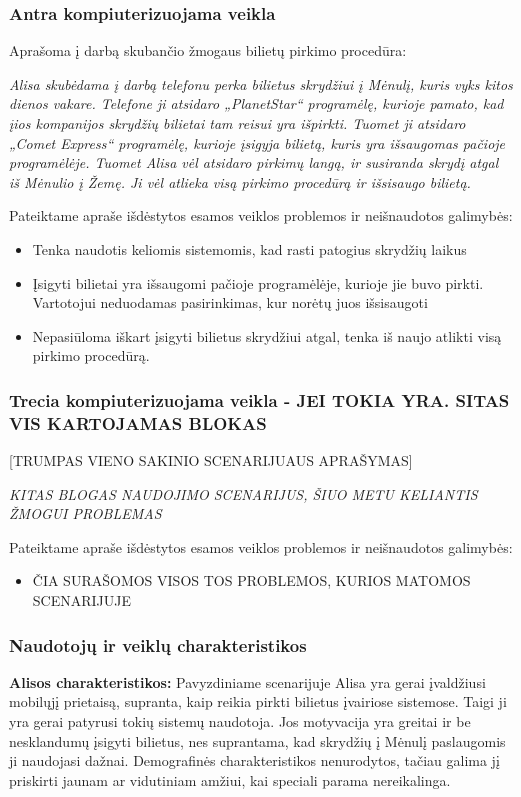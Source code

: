\documentclass{VUMIFPSkursinis}
\begin{document}
\subsubsection{Antra kompiuterizuojama veikla}
Aprašoma į darbą skubančio žmogaus bilietų pirkimo procedūra: 

\textit{Alisa skubėdama į darbą telefonu perka bilietus skrydžiui į Mėnulį, kuris vyks kitos dienos vakare. Telefone ji atsidaro „PlanetStar“ programėlę, kurioje pamato, kad įios kompanijos skrydžių bilietai tam reisui yra išpirkti. Tuomet ji atsidaro „Comet Express“ programėlę, kurioje įsigyja bilietą, kuris yra išsaugomas pačioje programėlėje. Tuomet Alisa vėl atsidaro pirkimų langą, ir susiranda skrydį atgal iš Mėnulio į Žemę. Ji vėl atlieka visą pirkimo procedūrą ir išsisaugo bilietą.}

Pateiktame apraše išdėstytos esamos veiklos problemos ir neišnaudotos galimybės:  
\begin{itemize}
\item Tenka naudotis keliomis sistemomis, kad rasti patogius skrydžių laikus
\item Įsigyti bilietai yra išsaugomi pačioje programėlėje, kurioje jie buvo pirkti. Vartotojui neduodamas pasirinkimas, kur norėtų juos išsisaugoti
\item Nepasiūloma iškart įsigyti bilietus skrydžiui atgal, tenka iš naujo atlikti visą pirkimo procedūrą.
\end{itemize}

\subsubsection{Trecia kompiuterizuojama veikla - JEI TOKIA YRA. SITAS VIS KARTOJAMAS BLOKAS}
[TRUMPAS VIENO SAKINIO SCENARIJUAUS APRAŠYMAS]

\textit{KITAS BLOGAS NAUDOJIMO SCENARIJUS, ŠIUO METU KELIANTIS ŽMOGUI PROBLEMAS}

Pateiktame apraše išdėstytos esamos veiklos problemos ir neišnaudotos galimybės:  
\begin{itemize}
\item ČIA SURAŠOMOS VISOS TOS PROBLEMOS, KURIOS MATOMOS SCENARIJUJE
\end{itemize}

\subsubsection{Naudotojų ir veiklų charakteristikos}
\textbf{Alisos charakteristikos: } Pavyzdiniame scenarijuje Alisa yra gerai įvaldžiusi mobilųjį prietaisą, supranta, kaip reikia pirkti bilietus įvairiose sistemose. Taigi ji yra gerai patyrusi tokių sistemų naudotoja. Jos motyvacija yra greitai ir be nesklandumų įsigyti bilietus, nes suprantama, kad skrydžių į Mėnulį paslaugomis ji naudojasi dažnai. Demografinės charakteristikos nenurodytos, tačiau galima jį priskirti jaunam ar vidutiniam amžiui, kai speciali parama nereikalinga. 
\end{document}
